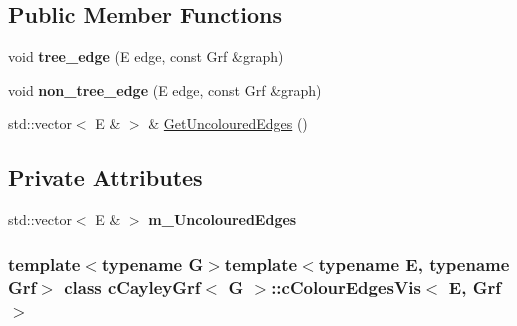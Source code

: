 \subsection*{\-Public \-Member \-Functions}
\begin{DoxyCompactItemize}
\item 
\hypertarget{classcCayleyGrf_1_1cColourEdgesVis_a6943930a8499e2dc40c1ff8d389e6aa2}{void {\bfseries tree\-\_\-edge} (\-E edge, const \-Grf \&graph)}\label{classcCayleyGrf_1_1cColourEdgesVis_a6943930a8499e2dc40c1ff8d389e6aa2}

\item 
\hypertarget{classcCayleyGrf_1_1cColourEdgesVis_a5e3642d81e1ae3e9bab5b063a9be440f}{void {\bfseries non\-\_\-tree\-\_\-edge} (\-E edge, const \-Grf \&graph)}\label{classcCayleyGrf_1_1cColourEdgesVis_a5e3642d81e1ae3e9bab5b063a9be440f}

\item 
std\-::vector$<$ \-E \& $>$ \& \hyperlink{classcCayleyGrf_1_1cColourEdgesVis_ab276cf1b92f16ca1aae832f0a1fdfdd9}{\-Get\-Uncoloured\-Edges} ()
\end{DoxyCompactItemize}
\subsection*{\-Private \-Attributes}
\begin{DoxyCompactItemize}
\item 
\hypertarget{classcCayleyGrf_1_1cColourEdgesVis_a5e243d1ea84763acd82dabb0faeadc62}{std\-::vector$<$ \-E \& $>$ {\bfseries m\-\_\-\-Uncoloured\-Edges}}\label{classcCayleyGrf_1_1cColourEdgesVis_a5e243d1ea84763acd82dabb0faeadc62}

\end{DoxyCompactItemize}
\subsubsection*{template$<$typename G$>$template$<$typename \-E, typename \-Grf$>$ class c\-Cayley\-Grf$<$ G $>$\-::c\-Colour\-Edges\-Vis$<$ E, Grf $>$}



